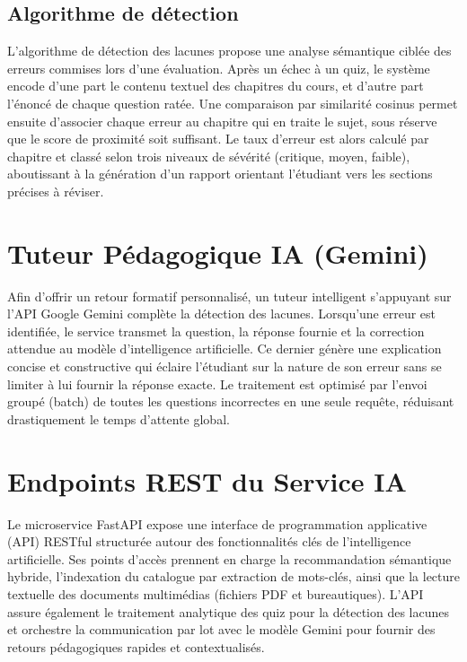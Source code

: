 \subsection{Algorithme de détection}

L'algorithme de détection des lacunes propose une analyse sémantique ciblée des erreurs commises lors d'une évaluation. Après un échec à un quiz, le système encode d'une part le contenu textuel des chapitres du cours, et d'autre part l'énoncé de chaque question ratée. Une comparaison par similarité cosinus permet ensuite d'associer chaque erreur au chapitre qui en traite le sujet, sous réserve que le score de proximité soit suffisant. Le taux d'erreur est alors calculé par chapitre et classé selon trois niveaux de sévérité (critique, moyen, faible), aboutissant à la génération d'un rapport orientant l'étudiant vers les sections précises à réviser.

\section{Tuteur Pédagogique IA (Gemini)}

Afin d'offrir un retour formatif personnalisé, un tuteur intelligent s'appuyant sur l'API Google Gemini complète la détection des lacunes. Lorsqu'une erreur est identifiée, le service transmet la question, la réponse fournie et la correction attendue au modèle d'intelligence artificielle. Ce dernier génère une explication concise et constructive qui éclaire l'étudiant sur la nature de son erreur sans se limiter à lui fournir la réponse exacte. Le traitement est optimisé par l'envoi groupé (batch) de toutes les questions incorrectes en une seule requête, réduisant drastiquement le temps d'attente global.

\section{Endpoints REST du Service IA}

Le microservice FastAPI expose une interface de programmation applicative (API) RESTful structurée autour des fonctionnalités clés de l'intelligence artificielle. Ses points d'accès prennent en charge la recommandation sémantique hybride, l'indexation du catalogue par extraction de mots-clés, ainsi que la lecture textuelle des documents multimédias (fichiers PDF et bureautiques). L'API assure également le traitement analytique des quiz pour la détection des lacunes et orchestre la communication par lot avec le modèle Gemini pour fournir des retours pédagogiques rapides et contextualisés.

